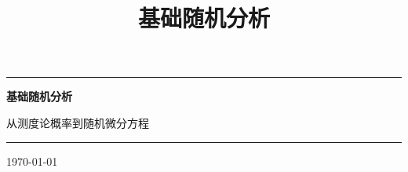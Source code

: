 \documentclass[UTF8,a4paper,oneside,zihao=-4,linespread=1.45,fontset=none]{ctexbook}
\title{\color{SADark}\bfseries 基础随机分析}
\author{}
\date{}
\theoremstyle{SAstyle}
\newcommand{\1}{\mathbb{1}}                 %
\begin{document}
\frontmatter
\begin{titlepage}
  \centering
  \vspace*{0.28\textheight}
  {\color{SABlue}\rule{0.75\textwidth}{1pt}}\par\vspace{1.2em}
  {\Huge\bfseries\color{SADark} 基础随机分析}\par\vspace{0.8em}
  {\large\color{SADark!80} 从测度论概率到随机微分方程}\par\vspace{1.0em}
  {\color{SABlue}\rule{0.75\textwidth}{1pt}}\par
  \vfill
  {\large\color{SADark!80}\today}\par
  \vspace*{0.08\textheight}
\end{titlepage}

\tableofcontents


\mainmatter







\backmatter

\end{document}
